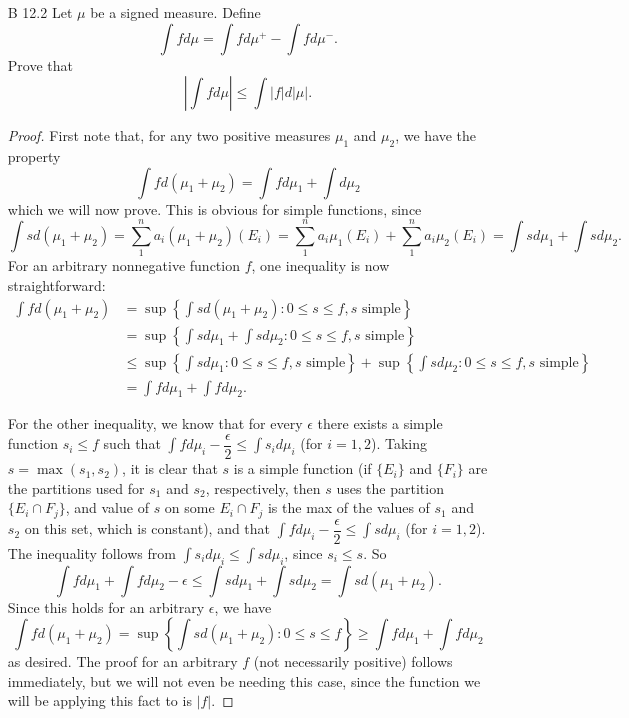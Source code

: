 \documentclass[10pt]{article}
\newcommand{\Int}{{\displaystyle \int}}
\begin{document}
\begin{enumerate}
\begin{proof}
Now, assume that $|\mu|(A) = 0$ and let $B \subset A$.  $B$ decomposes as $(B\cap E) \cup (B \cap F)$ with $B \cap E \subset A \cap E$ and $B \cap F \subset A \cap F$.  Since $|\mu|(A) = 0$ we know that $\mu^+(A \cap E) + \mu^-(A \cap F) = 0$.  Since both of these are positive measures, we must have $\mu^+(A \cap E) = 0 = \mu^-(A \cap F)$.  Again, because they are positive measures, we then have $\mu^+(B \cap E) \leq \mu^-(A \cap E) = 0$ and $\mu^-(B \cap F) \leq \mu^-(A \cap F) = 0$, so $\mu(B) = \mu^+(B \cap E) - \mu^-(B \cap F) = 0 - 0 = 0$.
\end{proof}

\item[B 12.2] Let $\mu$ be a signed measure.  Define
$$
\Int f d\mu = \Int f d\mu^+ - \Int f d\mu^-.
$$
Prove that
$$
\left| \Int f d\mu \right| \leq \Int |f| d|\mu|.
$$

\begin{proof}
First note that, for any two positive measures $\mu_1$ and $\mu_2$, we have the property
$$
\Int f d(\mu_1 + \mu_2) = \Int f d\mu_1 + \Int d\mu_2
$$
which we will now prove.  This is obvious for simple functions, since
$$
\Int s d(\mu_1 + \mu_2) = \sum_1^n a_i (\mu_1 + \mu_2)(E_i) = \sum_1^n a_i \mu_1(E_i) + \sum_1^n a_i \mu_2(E_i) = \Int s d\mu_1 + \Int s d\mu_2.
$$
For an arbitrary nonnegative function $f$, one inequality is now straightforward:
\begin{align*}
\Int f d(\mu_1 + \mu_2) &= \sup\left\{ \Int s d(\mu_1 + \mu_2) : 0 \leq s \leq f, s \text{ simple} \right\}
\\
&= \sup\left\{ \Int s d\mu_1 + \Int s d\mu_2 : 0 \leq s \leq f, s \text{ simple} \right\}
\\
&\leq \sup\left\{ \Int s d\mu_1 : 0 \leq s \leq f, s \text{ simple} \right\} + \sup\left\{ \Int s d\mu_2 : 0 \leq s \leq f, s \text{ simple} \right\}
\\
&= \Int f d\mu_1 + \Int f d\mu_2.
\end{align*}

For the other inequality, we know that for every $\epsilon$ there exists a simple function $s_i \leq f$ such that $\Int f d\mu_i - \dfrac{\epsilon}{2} \leq \Int s_i d\mu_i$ (for $i = 1,2$).  Taking $s = \max(s_1, s_2)$, it is clear that $s$ is a simple function (if $\{E_i\}$ and $\{F_i\}$ are the partitions used for $s_1$ and $s_2$, respectively, then $s$ uses the partition $\{E_i \cap F_j\}$, and value of $s$ on some $E_i \cap F_j$ is the max of the values of $s_1$ and $s_2$ on this set, which is constant), and that $\Int f d\mu_i - \dfrac{\epsilon}{2} \leq \Int s d\mu_i$ (for $i = 1,2$).  The inequality follows from $\Int s_i d\mu_i \leq \Int s d\mu_i$, since $s_i \leq s$.  So
$$\Int f d\mu_1 + \Int f d\mu_2 - \epsilon \leq \Int s d\mu_1 + \Int s d\mu_2 = \Int s d(\mu_1 + \mu_2).
$$
Since this holds for an arbitrary $\epsilon$, we have $$\Int f d(\mu_1 + \mu_2) = \sup\left\{\Int s d(\mu_1 + \mu_2) : 0 \leq s \leq f \right\} \geq \Int f d\mu_1 + \Int f d\mu_2$$
as desired.  The proof for an arbitrary $f$ (not necessarily positive) follows immediately, but we will not even be needing this case, since the function we will be applying this fact to is $|f|$.


\end{proof}
\end{enumerate}
\end{document}
